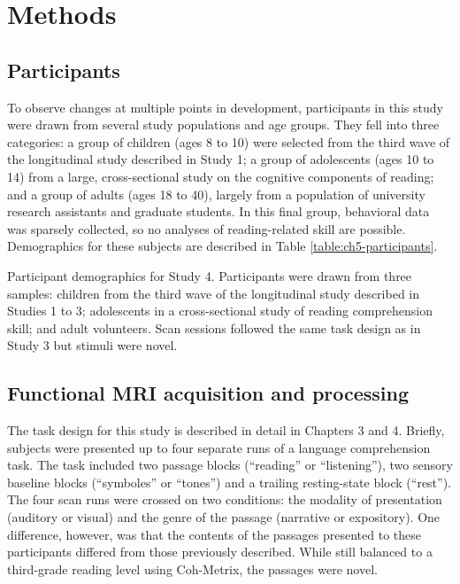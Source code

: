 \section{Methods}

\subsection{Participants}

To observe changes at multiple points in development, participants in this study were drawn from several study populations and age groups. They fell into three categories: a group of children (ages 8 to 10) were selected from the third wave of the longitudinal study described in Study 1;  a group of adolescents (ages 10 to 14) from a large, cross-sectional study on the cognitive components of reading; and a group of adults (ages 18 to 40), largely from a population of university research assistants and graduate students. In this final group, behavioral data was sparsely collected, so no analyses of reading-related skill are possible. Demographics for these subjects are described in Table \ref{table:ch5-participants}.

\begin{table}[t]
	\renewcommand{\tabcolsep}{0.09cm}
	\centering
	
	\caption[Participant demographics for Study 4]{Participant demographics for Study 4. Participants were drawn from three samples: children from the third wave of the longitudinal study described in Studies 1 to 3; adolescents in a cross-sectional study of reading comprehension skill; and adult volunteers. Scan sessions followed the same task design as in Study 3 but stimuli were novel.}
	\label{table:ch5-participants}
\end{table}

\subsection{Functional MRI acquisition and processing}

The task design for this study is described in detail in Chapters 3 and 4. Briefly, subjects were presented up to four separate runs of a language comprehension task. The task included two passage blocks (``reading'' or ``listening''), two sensory baseline blocks (``symboles'' or ``tones'') and a trailing resting-state block (``rest''). The four scan runs were crossed on two conditions: the modality of presentation (auditory or visual) and the genre of the passage (narrative or expository). One difference, however, was that the contents of the passages presented to these participants differed from those previously described. While still balanced to a third-grade reading level using Coh-Metrix, the passages were novel. 

